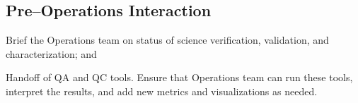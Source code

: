 




\subsection{Pre--Operations Interaction}

Brief the Operations team on status of science verification, validation, and characterization; and

Handoff of QA and QC tools. Ensure that Operations team can run these tools, interpret the results, and add new metrics and visualizations as needed.

